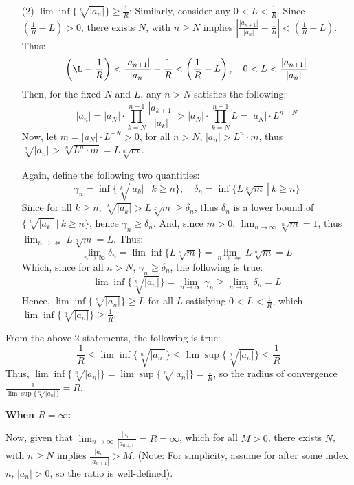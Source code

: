 \documentclass{article}
\begin{document}
\begin{itemize}
    \hfill

    \item[(2)] $\lim\inf\{\sqrt[n]{|a_n|}\}\geq \frac{1}{R}$: Similarly, consider any $0<L<\frac{1}{R}$. Since $(\frac{1}{R}-L)>0$, there exists $N$, with $n\geq N$ implies $\left|\frac{|a_{n+1}|}{|a_n|}-\frac{1}{R}\right|<(\frac{1}{R}-L)$. Thus:
    $$\left(\L-\frac{1}{R}\right)<\frac{|a_{n+1}|}{|a_n|}-\frac{1}{R}<\left(\frac{1}{R}-L\right),\quad 0<L<\frac{|a_{n+1}|}{|a_n|}$$
    Then, for the fixed $N$ and $L$, any $n>N$ satisfies the following:
    $$|a_n|=|a_N|\cdot\prod_{k=N}^{n-1}\frac{|a_{k+1}|}{|a_k|} > |a_N|\cdot\prod_{k=N}^{n-1}L = |a_N|\cdot L^{n-N}$$
    Now, let $m=|a_N|\cdot L^{-N}>0$, for all $n>N$, $|a_n|>L^n\cdot m$, thus $\sqrt[n]{|a_n|}>\sqrt[n]{L^n\cdot m} = L\sqrt[n]{m}$.

    Again, define the following two quantities:
    $$\gamma_n=\inf\{\sqrt[k]{|a_k|}\ |\ k\geq n\},\quad \delta_n = \inf\{L\sqrt[k]{m}\ |\ k\geq n\}$$
    Since for all $k\geq n$, $\sqrt[k]{|a_k|}>L\sqrt[k]{m} \geq \delta_n$, thus $\delta_n$ is a lower bound of $\{\sqrt[k]{|a_k|}\ |\ k\geq n\}$, hence $\gamma_n \geq \delta_n$.
    And, since $m>0$, $\lim_{n\rightarrow\infty}\sqrt[n]{m}=1$, thus $\lim_{n\rightarrow\nLeftarrow}L\sqrt[n]{m}=L$. Thus:
    $$\lim_{n\rightarrow\infty}\delta_n = \lim\inf\{L\sqrt[n]{m}\} =\lim_{n\rightarrow\nLeftarrow}L\sqrt[n]{m}=L$$
    Which, since for all $n>N$, $\gamma_n\geq \delta_n$, the following is true:
    $$\lim\inf\{\sqrt[n]{|a_n|}\}=\lim_{n\rightarrow\infty}\gamma_n \geq \lim_{n\rightarrow\infty}\delta_n=L$$
    Hence, $\lim\inf\{\sqrt[n]{|a_n|}\}\geq L$ for all $L$ satisfying $0<L<\frac{1}{R}$, which $\lim\inf\{\sqrt[n]{|a_n|}\}\geq \frac{1}{R}$.
\end{itemize}

From the above 2 statements, the following is true:
$$\frac{1}{R}\leq\lim\inf\{\sqrt[n]{|a_n|}\}\leq \lim\sup\{\sqrt[n]{|a_n|}\}\leq \frac{1}{R}$$
Thus, $\lim\inf\{\sqrt[n]{|a_n|}\}= \lim\sup\{\sqrt[n]{|a_n|}\}=\frac{1}{R}$, so the radius of convergence $\frac{1}{\lim\sup\{\sqrt[n]{|a_n|}\}}=R$.

\hfill

\hfill

\hfill

\textbf{When $R=\infty$:}

Now, given that $\lim_{n\rightarrow\infty}\frac{|a_{n}|}{|a_{n+1}|}=R=\infty$, which for all $M>0$, there exists $N$, with $n\geq N$ implies $\frac{|a_n|}{|a_{n+1}|}>M$.
(Note: For simplicity, assume for after some index $n$, $|a_n|>0$, so the ratio is well-defined).
\end{document}
